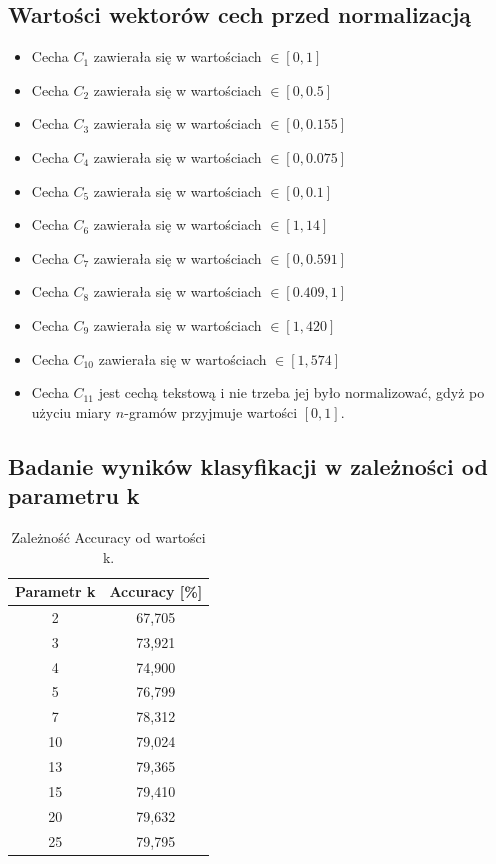 \documentclass{classrep}
\begin{document}
\subsection{Wartości wektorów cech przed normalizacją}
\begin{itemize}
	\item Cecha $C_{1}$ zawierała się w wartościach $\in [0,1]$
	\item Cecha $C_{2}$ zawierała się w wartościach $\in [0,0.5]$
	\item Cecha $C_{3}$ zawierała się w wartościach $\in [0,0.155]$
	\item Cecha $C_{4}$ zawierała się w wartościach $\in [0,0.075]$
	\item Cecha $C_{5}$ zawierała się w wartościach $\in [0,0.1]$
	\item Cecha $C_{6}$ zawierała się w wartościach $\in [1,14]$
	\item Cecha $C_{7}$ zawierała się w wartościach $\in [0,0.591]$
	\item Cecha $C_{8}$ zawierała się w wartościach $\in [0.409,1]$
	\item Cecha $C_{9}$ zawierała się w wartościach $\in [1,420]$
	\item Cecha $C_{10}$ zawierała się w wartościach $\in [1,574]$
	\item Cecha $C_{11}$ jest cechą tekstową i nie trzeba jej było normalizować, gdyż po użyciu miary $n$-gramów przyjmuje wartości $[0,1]$.
\end{itemize}



\subsection{Badanie wyników klasyfikacji w zależności od parametru k}
\begin{table}[h!]
	\centering
	\begin{tabular} {c c}
		\hline
		\textbf{Parametr k} & \textbf{Accuracy [\%]} \\ [0.5ex] 
		\hline
		\hline 
		2 & 67,705 \\ 
		3 & 73,921 \\
		4 & 74,900 \\
		5 & 76,799 \\
		7 & 78,312 \\
		10 & 79,024 \\
		13 & 79,365 \\
		15 & 79,410 \\
		20 & 79,632 \\
		25 & 79,795 \\
		\hline
	\end{tabular}
	\caption{Zależność Accuracy od wartości k. }
	\label{tabelaK}
\end{table}
\end{document}
